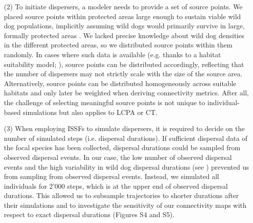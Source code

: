 \documentclass[abstract=on,10pt,a4paper,bibliography=totocnumbered]{article}
\begin{document}
(2) To initiate dispersers, a modeler needs to provide a set of source points.
We placed source points within protected areas large enough to sustain viable
wild dog populations, implicitly assuming wild dogs would primarily survive in
large, formally protected areas \citep{Woodroffe.1999, DaviesMostert.2012,
Woodroffe.2012, VanDerMeer.2014}. We lacked precise knowledge about wild dog
densities in the different protected areas, so we distributed source points
within them randomly. In cases where such data is available (e.g. thanks to a
habitat suitability model; \citealp{Squires.2013}), source points can be
distributed accordingly, reflecting that the number of dispersers may not
strictly scale with the size of the source area. Alternatively, source points
can be distributed homogeneously across suitable habitats and only later be
weighted when deriving connectivity metrics. After all, the challenge of
selecting meaningful source points is not unique to individual-based simulations
but also applies to LCPA or CT.

(3) When employing ISSFs to simulate dispersers, it is required to decide on the
number of simulated steps (i.e. dispersal durations). If sufficient dispersal
data of the focal species has been collected, dispersal durations could be
sampled from observed dispersal events. In our case, the low number of observed
dispersal events and the high variability in wild dog dispersal durations (see
\citep{DaviesMostert.2012, Masenga.2016, Cozzi.2020, Hofmann.2021}) prevented us
from sampling from observed dispersal events. Instead, we simulated all
individuals for 2'000 steps, which is at the upper end of observed dispersal
durations. This allowed us to subsample trajectories to shorter durations after
their simulations and to investigate the sensitivity of our connectivity maps
with respect to exact dispersal durations (Figures S4 and S5).
\end{document}
